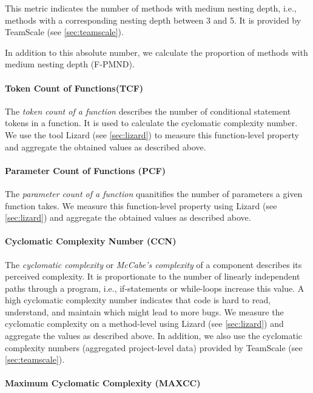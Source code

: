 \documentclass{scrartcl}
\begin{document}
This metric indicates the number of methods with medium nesting depth, i.e.,
methods with a corresponding nesting depth between 3 and 5. It is provided by
TeamScale (see \ref{sec:teamscale}).

In addition to this absolute number, we calculate the proportion of methods with
medium nesting depth (F-PMND).

\paragraph{Token Count of Functions(TCF)}

The \emph{token count of a function} describes the number of conditional
statement tokens in a function. It is used to calculate the cyclomatic
complexity number. We use the tool Lizard (see \ref{sec:lizard}) to measure this
function-level property and aggregate the obtained values as described above.

\paragraph{Parameter Count of Functions (PCF)}

The \emph{parameter count of a function} quanitifies the number of parameters a
given function takes. We measure this function-level property using Lizard (see
\ref{sec:lizard}) and aggregate the obtained values as described above.

\paragraph{Cyclomatic Complexity Number (CCN)}

The \emph{cyclomatic complexity} or \emph{McCabe's complexity} of a component
describes its perceived complexity. It is proportionate to the number of
linearly independent paths through a program, i.e., if-statements
or while-loops increase this value. A high cyclomatic complexity number
indicates that code is hard to read, understand, and maintain which might lead
to more bugs. We measure the cyclomatic complexity on a
method-level using Lizard (see \ref{sec:lizard}) and aggregate the values as
described above. In addition, we also use the cyclomatic complexity numbers
(aggregated project-level data) provided by TeamScale (see \ref{sec:teamscale}).

\paragraph{Maximum Cyclomatic Complexity (MAXCC)}
\end{document}
